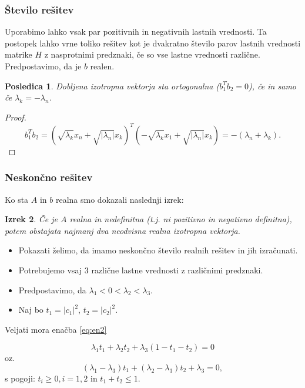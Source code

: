 \documentclass{beamer}
\newcommand{\abs}[1]{ \left\lvert#1\right\rvert}
\newtheorem{izrek}{Izrek}
\newtheorem{posledica}[izrek]{Posledica}
\begin{document}
\begin{frame}
\frametitle{Število rešitev}
Uporabimo lahko vsak par pozitivnih in negativnih lastnih vrednosti. Ta postopek lahko vrne toliko rešitev kot je dvakratno število parov lastnih vrednosti matrike $H$ z nasprotnimi predznaki, če so vse lastne vrednosti različne. Predpostavimo, da je $b$ realen.\pause
\begin{posledica}%
Dobljena izotropna vektorja sta ortogonalna ($b_1 ^T b_2=0$), če in samo če $\lambda_k=-\lambda_n$.
\end{posledica}\pause
\begin{proof}%
$$b_1 ^T b_2=(\sqrt{\lambda_k}x_n+\sqrt{\abs{\lambda_n}}x_k)^T (-\sqrt{\lambda_k}x_1+\sqrt{\abs{\lambda_n}}x_k )= -(\lambda_n +\lambda_k).$$
\end{proof}
\end{frame}
\begin{frame}
\frametitle{Neskončno rešitev}
Ko sta $A$ in $b$ realna smo dokazali naslednji izrek:
\begin{izrek}
Če je $A$ realna in nedefinitna (t.j. ni pozitivno in negativno definitna), potem obstajata najmanj dva neodvisna realna izotropna vektorja.
\end{izrek}\pause
\begin{itemize}
\item Pokazati želimo, da imamo neskončno število realnih rešitev in jih izračunati. 
\item Potrebujemo vsaj 3 različne lastne vrednosti z različnimi predznaki.
\end{itemize}
\end{frame}
\begin{frame}
\begin{itemize}
\item Predpostavimo, da $\lambda_1 <0<\lambda_2<\lambda_3$.\pause
\item Naj bo $t_1=\abs{c_1}^2$, $t_2=\abs{c_2}^2$.\pause
\end{itemize}
Veljati mora enačba \eqref{eq:en2}
\begin{block}{}
\begin{equation*}%
\lambda_1 t_1 +\lambda_2 t_2 +\lambda_3 (1- t_1 -t_2)=0
\end{equation*} oz.
\begin{equation*}
(\lambda_1 -\lambda_3)t_1 +(\lambda_2 -\lambda_3)t_2 +\lambda_3=0,
\end{equation*}
s pogoji: $t_i \ge 0, i=1,2$ in $t_1 +t_2\le1$.
\end{block}{}
\end{frame}
\end{document}
